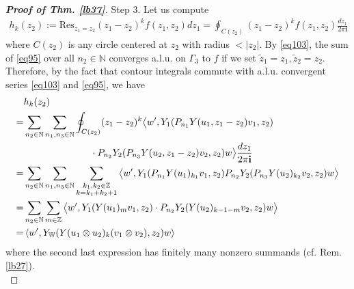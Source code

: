 \documentclass[11pt,b5paper,notitlepage]{article}
\theoremstyle{definition}
\theoremstyle{plain}
\newcommand{\wtd}{\widetilde}
\newcommand{\Res}{\mathrm{Res}}
\newcommand{\im}{\mathbf{i}}
\newcommand{\Wbb}{\mathbb W}
\newcommand{\Nbb}{\mathbb N}
\newcommand{\Zbb}{\mathbb Z}
\newcommand{\<}{\left\langle}
\renewcommand{\>}{\right\rangle}
\numberwithin{equation}{section}
\begin{document}
\begin{proof}[\textbf{Proof of Thm. \ref{lb37}}]
Step 3. Let us compute 
\begin{align*}
h_k(z_2):=\Res_{z_1=z_2}(z_1-z_2)^k f(z_1,z_2)dz_1=\oint_{C(z_2)} (z_1-z_2)^k f(z_1,z_2)\frac{dz_1}{2\pi\im}
\end{align*}
where $C(z_2)$ is any circle centered at $z_2$ with radius $<|z_2|$. By \eqref{eq103}, the sum of \eqref{eq95} over all $n_2\in\Nbb$ converges a.l.u. on $\Gamma_3$ to $f$ if we set $\wtd z_1=z_1,\wtd z_2=z_2$. Therefore, by the fact that contour integrals commute with a.l.u. convergent series \eqref{eq103} and \eqref{eq95}, we have
\begin{align}
&h_k(z_2)\nonumber\\
=&\sum_{n_2\in\Nbb}\sum_{n_1,n_3\in\Nbb}\oint_{C(z_2)} (z_1-z_2)^k\big\langle w',Y_1(P_{n_1}Y(u_1,z_1-z_2)v_1,z_2)\nonumber\\
&\qquad\qquad\qquad\quad\cdot P_{n_2}Y_2(P_{n_3}Y(u_2,z_1-z_2)v_2, z_2)w\big\rangle \frac{dz_1}{2\pi\im}\nonumber\\
=&\sum_{n_2\in\Nbb}\sum_{n_1,n_3\in\Nbb}\sum_{
\begin{subarray}{c}
k_1,k_2\in\Zbb\\
k=k_1+k_2+1
\end{subarray}
}\big\langle w',Y_1(P_{n_1}Y(u_1)_{k_1}v_1,z_2) P_{n_2}Y_2(P_{n_3}Y(u_2)_{k_2}v_2, z_2)w\big\rangle \nonumber\\
=&\sum_{n_2\in\Nbb}\sum_{m\in\Zbb} \big\langle w',Y_1(Y(u_1)_mv_1,z_2)\cdot P_{n_2}Y_2(Y(u_2)_{k-1-m}v_2,z_2)w\big\rangle \nonumber\\
=&\<w',Y_\Wbb(Y(u_1\otimes u_2)_k(v_1\otimes v_2),z_2)w\>  \label{eq106}
\end{align}
where the second last expression has finitely many nonzero summands (cf. Rem. \ref{lb27}).\\[-1ex]


\end{proof}
\end{document}
